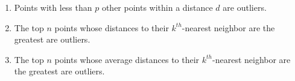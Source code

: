 \begin{enumerate}
    \item Points with less than $p$ other points within a distance $d$ are outliers.
    \item The top $n$ points whose distances to their $k^{th}$-nearest neighbor are the greatest are outliers.
    \item The top $n$ points whose average distances to their $k^{th}$-nearest neighbor are the greatest are outliers.
\end{enumerate}


\begin{comment}
CLIQUE scales linearly with input records, but does identify subspaces within the original dataset.
CLIQUE clusters based on subspaces it identifies via density estimates, it does not cluster in the full dimensionality of the input data.
This seems to be the premonition of manifold finding.
Restricted look to subspaces of the original set, not fictitious subspaces dreamed up via techniques such as Principle Component Analysis.
CLIQUE finds areas of higher density, which are the clusters.
Begins by partitioning the full space into units then estimates density within that cell.
All clusters are axis-parallel hyper-rectangles. Each cluster is a union of adjacent dense cells.
Compact representation is then found by covering the cluster with a minimal number of maximal, possibly overlapping rectangles and describing the cluster as the union of said rectangles.
CLIQUE is also tolerant to incomplete data points.
Requires density threshold and number of intervals over the full space as parameters.
Categorical data is ordered arbitrarily, with an empty interval placed in-between ever pair.
Is deterministic, always yields the same results.
Runs in $O(c^k + m k)$ where $c$ is some constant, $k$ is the dimensionality, and $m$ is the number of points.
Tested on dimensionality up to 50.
In experiments run for this paper, BIRCH failed starting at 20 dimensions, DBSCAN at 8, CLIQUE made it to 50 without failure.
\cite{rakesh_agrawal_automatic_1998}
\end{comment}
